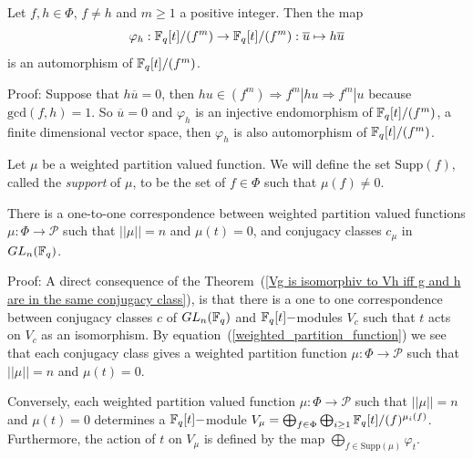 \begin{dang}
    \begin{lemma}\label{gcd(f,h)=1 then h acts as an automorphism of Fq[t]/f}
        Let $f,h\in\Phi$, $f\neq h$ and $m\geq1$ a positive integer. Then the map
        \begin{equation}
            \varphi_h:\mathbb{F}_q[t]/(f^m)\rightarrow \mathbb{F}_q[t]/(f^m): \overline{u}\mapsto h\overline{u}
        \end{equation}
        is an automorphism of $\mathbb{F}_q[t]/(f^m)$.
    \end{lemma}
\end{dang}
Proof: Suppose that $h\overline{u}=0$, then $hu\in(f^m)\Rightarrow f^m|hu\Rightarrow f^m|u$ because $\text{gcd}(f,h)=1$. So $\overline{u}=0$ and $\varphi_h$ is an injective endomorphism of $\mathbb{F}_q[t]/(f^m)$, a finite dimensional vector space, then $\varphi_h$ is also automorphism of $\mathbb{F}_q[t]/(f^m)$.
\begin{dang}
    \begin{definition}
         Let $\mu$ be a weighted partition valued function. We will define the set $\text{Supp}(f)$, called the \textit{support} of $\mu$, to be the set of $f\in\Phi$ such that $\mu(f)\neq0$.
    \end{definition}   
\end{dang}
\begin{dang}
    \begin{theorem}\label{cojugacy_classes_and_partition_functions}
        There is a one-to-one correspondence between weighted partition valued functions $\mu:\Phi\rightarrow\mathcal{P}$ such that $||\mu||=n$ and $\mu(t)=0$, and conjugacy classes $c_{\mu}$ in $GL_n(\mathbb{F}_q)$.
    \end{theorem}
\end{dang}
Proof: A direct consequence of the Theorem~(\ref{Vg is isomorphiv to Vh iff g and h are in the same conjugacy class}), is that there is a one to one correspondence between conjugacy classes $c$ of $GL_n(\mathbb{F}_q)$ and $\mathbb{F}_q[t]-$modules $V_c$ such that $t$ acts on $V_c$ as an isomorphism. By equation~(\ref{weighted_partition_function}) we see that each conjugacy class gives a weighted partition function $\mu:\Phi\rightarrow \mathcal{P}$ such that $||\mu||=n$ and $\mu(t)=0$. 
\par
Conversely, each weighted partition valued function $\mu:\Phi\rightarrow\mathcal{P}$ such that $||\mu||=n$ and $\mu(t)=0$ determines a $\mathbb{F}_q[t]-$module $V_{\mu}=\bigoplus_{f\in\Phi}\bigoplus_{i\geq1}\mathbb{F}_q[t]/(f)^{\mu_i(f)}$. Furthermore, the action of $t$ on $V_{\mu}$ is defined by the map $\bigoplus_{f\in\text{Supp}(\mu)}\varphi_t$.
